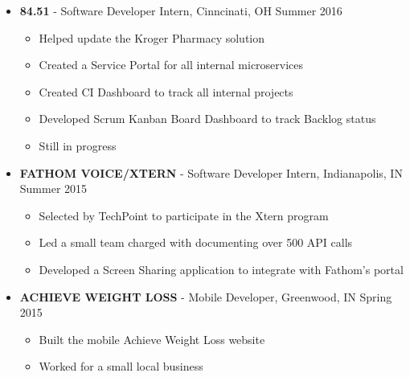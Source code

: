 \documentclass[10pt]{article} %
\begin{document}
\begin{itemize}
	\item[] \textbf{ 84.51\degree} - Software Developer Intern, Cinncinati, OH \hfill{Summer 2016}
	\begin{itemize}
		\item Helped update the Kroger Pharmacy solution
		\item Created a Service Portal for all internal microservices
		\item Created CI Dashboard to track all internal projects
		\item Developed Scrum Kanban Board Dashboard to track Backlog status
		\item Still in progress
	\end{itemize}
	\item[] \textbf{\small FATHOM VOICE/XTERN} - Software Developer Intern, Indianapolis, IN \hfill{Summer 2015}
	\begin{itemize}
		\item Selected by TechPoint to participate in the Xtern program
		\item Led a small team charged with documenting over 500 API calls
		\item Developed a Screen Sharing application to integrate with Fathom's portal
	\end{itemize}
	\item[] \textbf{\small ACHIEVE WEIGHT LOSS} - Mobile Developer, Greenwood, IN \hfill{Spring 2015}
	\begin{itemize}
		\item Built the mobile Achieve Weight Loss website
		\item Worked for a small local business 
	\end{itemize}
\end{itemize}
\end{document}
